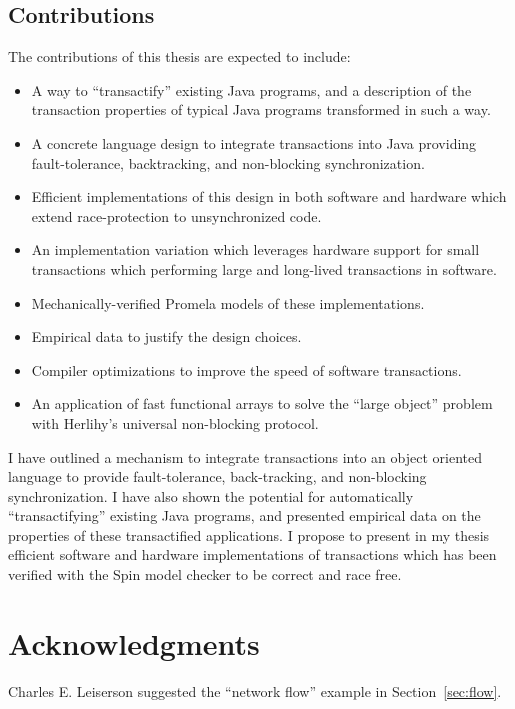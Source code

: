 \documentclass[12pt,twoside]{article}
\newcommand{\note}[1]{}%
\newcommand{\punt}[1]{}%
\newcommand{\subsecput}[2]{\subsection{#2}\label{sec:#1}}
\newcommand{\figref}[1]         {Figure~\ref{fig:#1}}
\newcommand{\secref}[1]         {Section~\ref{sec:#1}}
\begin{document}
\subsecput{contrib}{Contributions}
The contributions of this thesis are expected to include:
\begin{itemize}
\item A way to ``transactify'' existing Java programs, and a
  description of the transaction properties of typical Java programs
  transformed in such a way.
\item A concrete language design to integrate transactions into Java
  providing fault-tolerance, backtracking, and non-blocking
  synchronization.
\item Efficient implementations of this design in both software and
  hardware which extend race-protection to unsynchronized code.
\item An implementation variation which leverages hardware
  support for small transactions which performing large and long-lived
  transactions in software.
\item Mechanically-verified Promela models of these implementations.
\item Empirical data to justify the design choices.
\item Compiler optimizations to improve the speed of software
  transactions.
\item An application of fast functional arrays to solve the ``large
  object'' problem with Herlihy's universal non-blocking protocol.
  \note{Short section; cite my Area Exam as a Technical Report here
  for more details. Omit this?}
\end{itemize}

I have outlined a mechanism to integrate transactions into an object
oriented language to provide fault-tolerance, back-tracking, and
non-blocking synchronization.  I have also shown the potential for
automatically ``transactifying'' existing Java programs, and presented
empirical data on the properties of these transactified applications.
I propose to present in my thesis
efficient software and hardware implementations of transactions which
has been verified with the Spin model checker to be correct and race
free.

\section*{Acknowledgments}
Charles E. Leiserson suggested the ``network flow'' example in
\secref{flow}.
\punt{Sean Lie adapted the hardware simulator which
provided the timings in \figref{hw-timings}.}
\end{document}
